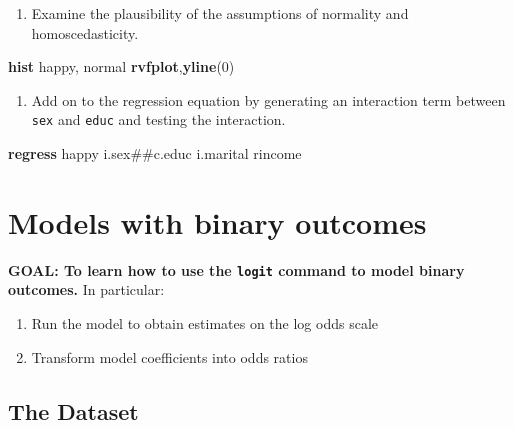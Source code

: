 \documentclass[
]{book}
\newenvironment{Shaded}{\begin{snugshade}}{\end{snugshade}}
\newcommand{\FunctionTok}[1]{\textcolor[rgb]{0.00,0.00,0.00}{#1}}
\newcommand{\KeywordTok}[1]{\textcolor[rgb]{0.13,0.29,0.53}{\textbf{#1}}}
\newcommand{\NormalTok}[1]{#1}
\providecommand{\tightlist}{%
  \setlength{\itemsep}{0pt}\setlength{\parskip}{0pt}}
\begin{document}
\begin{enumerate}
\def\labelenumi{\arabic{enumi}.}
\setcounter{enumi}{2}
\tightlist
\item
  Examine the plausibility of the assumptions of normality and homoscedasticity.
\end{enumerate}

\begin{Shaded}
\begin{Highlighting}[]
\KeywordTok{hist}\NormalTok{ happy, }\FunctionTok{normal} 
\KeywordTok{rvfplot}\NormalTok{,}\KeywordTok{yline}\NormalTok{(0)}
\end{Highlighting}
\end{Shaded}

\begin{enumerate}
\def\labelenumi{\arabic{enumi}.}
\setcounter{enumi}{3}
\tightlist
\item
  Add on to the regression equation by generating an interaction term between \texttt{sex} and \texttt{educ} and testing the interaction.
\end{enumerate}

\begin{Shaded}
\begin{Highlighting}[]
\KeywordTok{regress}\NormalTok{ happy i.sex\#\#c.educ i.marital rincome}
\end{Highlighting}
\end{Shaded}

\hypertarget{models-with-binary-outcomes-1}{%
\section{Models with binary outcomes}\label{models-with-binary-outcomes-1}}

\textbf{GOAL: To learn how to use the \texttt{logit} command to model binary outcomes.} In particular:

\begin{enumerate}
\def\labelenumi{\arabic{enumi}.}
\tightlist
\item
  Run the model to obtain estimates on the log odds scale
\item
  Transform model coefficients into odds ratios
\end{enumerate}

\hypertarget{the-dataset-1}{%
\subsection{The Dataset}\label{the-dataset-1}}
\end{document}
